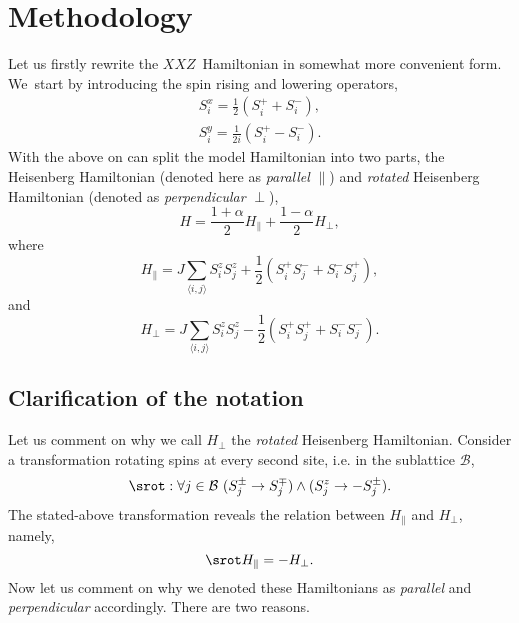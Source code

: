 \documentclass[12pt, a4paper]{article}
\newcommand{\mean}[1]{\langle#1\rangle}
\begin{document}
\section{Methodology}
Let us firstly rewrite the $XXZ$~Hamiltonian in somewhat more convenient form. We~start by introducing the spin rising and lowering operators,
\begin{equation}
\begin{aligned}
S_i^x = \frac{1}{2}\left(S_i^+ + S_i^-\right), \\
S_i^y = \frac{1}{2i}\left(S_i^+ - S_i^-\right).
\end{aligned}
\end{equation}
With the above on can split the model Hamiltonian into two parts, the Heisenberg Hamiltonian (denoted here as \textit{parallel} $\parallel$) and \textit{rotated} Heisenberg Hamiltonian (denoted as \textit{perpendicular} $\perp$),
\begin{equation}
H = \frac{1+\alpha}{2} H_{\parallel} + \frac{1-\alpha}{2} H_{\perp},
\end{equation}
where
\begin{equation}
H_{\parallel} = J\sum_{\mean{i,j}}S_i^z S_j^z + \frac{1}{2}\left(S_i^+ S_j^- + S_i^- S_j^+\right),
\end{equation}
and
\begin{equation}
H_{\perp} = J\sum_{\mean{i,j}} S_i^z S_j^z - \frac{1}{2}\left(S_i^+ S_j^+ + S_i^- S_j^-\right).
\end{equation}

\subsection{Clarification of the notation}
Let us comment on why we call $H_{\perp}$ the \textit{rotated} Heisenberg Hamiltonian. Consider a transformation rotating spins at every second site, i.e. in the sublattice $\mathcal{B}$,
\begin{equation}
\srot : \forall j\in\mathcal{B} \ (S_j^{\pm} \rightarrow S_j^{\mp}) \land (S_j^{z} \rightarrow -S_j^{\pm}).
\end{equation}
The stated-above transformation reveals the relation between $H_{\parallel}$ and $H_{\perp}$, namely,
\begin{equation}\label{eq:rot_relation}
\srot H_{\parallel} = -H_{\perp}.
\end{equation}
Now let us comment on why we denoted these Hamiltonians as \textit{parallel} and \textit{perpendicular} accordingly. There are two reasons. 
\end{document}
